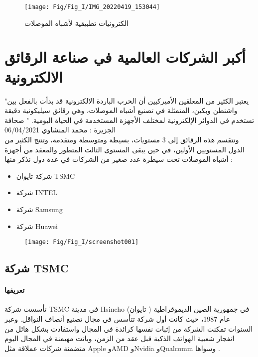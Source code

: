 \begin{figure}[bh]
	\centering
	\texttt{[image: Fig/Fig\_I/IMG\_20220419\_153044]}
	\caption{الكترونيات تطبيقية لأشباه الموصلات}
	\label{fig:img20220419153044}
\end{figure}


\section { أكبر الشركات العالمية في صناعة الرقائق الالكترونية }

"يعتبر الكثير من المعلقين الأميركيين أن الحرب الباردة الالكترونية قد بدأت بالفعل بين واشنطن وبكين، المتمثلة في تصنيع أشباه الموصلات، وهي رقائق سيليكونية دقيقة تستخدم في الدوائر الإلكترونية لمختلف الأجهزة المستخدمة في الحياة اليومية. "  صحافة الجزيرة : محمد المنشاوي 06/04/2021 \\

وتتقسم هذه الرقائق إلى 3 مستويات، بسيطة ومتوسطة ومتقدمة، وتنتج الكثير من الدول المستويين الأولين، في حين يبقى المستوى الثالث المتطور والمعقد من أجهزة أشباه الموصلات تحت سيطرة عدد صغير من الشركات في عدة دول نذكر منها :

\begin{itemize}
	\item 
	
	شركة تايوان  TSMC
	\item 
	شركة INTEL 
	\item 
	شركة Samsung 
	\item 
	شركة Huawei
\end{itemize}

\begin{figure}[h!]
	\centering
	\texttt{[image: Fig/Fig\_I/screenshot001]}
	\caption{}
	\label{fig:screenshot001}
\end{figure}

\subsection{ شركة TSMC  }
\paragraph{تعريفها}
تأسست شركة TSMC في مدينة Hsincho في جمهورية الصين الديموقراطية ( تايوان) عام 1987، حيث كانت أول شركة تتأسس في مجال تصنيع أنصاف النواقل. وعبر السنوات تمكنت الشركة من إثبات نفسها كرائدة في المجال  واستفادت بشكل هائل من انفجار شعبية الهواتف الذكية قبل عقد من الزمن، وباتت مهيمنة في المجال اليوم متضمنة شركات عملاقة مثل Apple وAMD وNvidia وQualcomm وسواها .
